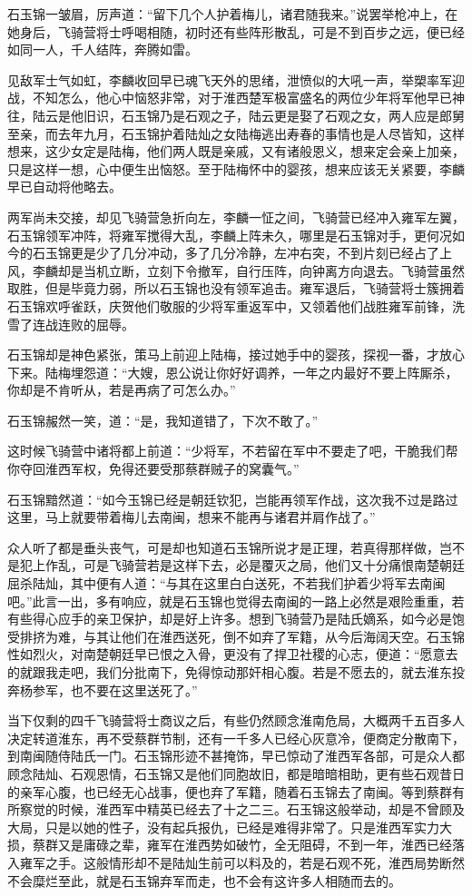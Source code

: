 石玉锦一皱眉，厉声道：“留下几个人护着梅儿，诸君随我来。”说罢举枪冲上，在她身后，飞骑营将士呼喝相随，初时还有些阵形散乱，可是不到百步之远，便已经如同一人，千人结阵，奔腾如雷。

见敌军士气如虹，李麟收回早已魂飞天外的思绪，泄愤似的大吼一声，举槊率军迎战，不知怎么，他心中恼怒非常，对于淮西楚军极富盛名的两位少年将军他早已神往，陆云是他旧识，石玉锦乃是石观之子，陆云更是娶了石观之女，两人应是郎舅至亲，而去年九月，石玉锦护着陆灿之女陆梅逃出寿春的事情也是人尽皆知，这样想来，这少女定是陆梅，他们两人既是亲戚，又有诸般恩义，想来定会亲上加亲，只是这样一想，心中便生出恼怒。至于陆梅怀中的婴孩，想来应该无关紧要，李麟早已自动将他略去。

两军尚未交接，却见飞骑营急折向左，李麟一怔之间，飞骑营已经冲入雍军左翼，石玉锦领军冲阵，将雍军搅得大乱，李麟上阵未久，哪里是石玉锦对手，更何况如今的石玉锦更是少了几分冲动，多了几分冷静，左冲右突，不到片刻已经占了上风，李麟却是当机立断，立刻下令撤军，自行压阵，向钟离方向退去。飞骑营虽然取胜，但是毕竟力弱，所以石玉锦也没有领军追击。雍军退后，飞骑营将士簇拥着石玉锦欢呼雀跃，庆贺他们敬服的少将军重返军中，又领着他们战胜雍军前锋，洗雪了连战连败的屈辱。

石玉锦却是神色紧张，策马上前迎上陆梅，接过她手中的婴孩，探视一番，才放心下来。陆梅埋怨道：“大嫂，恩公说让你好好调养，一年之内最好不要上阵厮杀，你却是不肯听从，若是再病了可怎么办。”

石玉锦赧然一笑，道：“是，我知道错了，下次不敢了。”

这时候飞骑营中诸将都上前道：“少将军，不若留在军中不要走了吧，干脆我们帮你夺回淮西军权，免得还要受那蔡群贼子的窝囊气。”

石玉锦黯然道：“如今玉锦已经是朝廷钦犯，岂能再领军作战，这次我不过是路过这里，马上就要带着梅儿去南闽，想来不能再与诸君并肩作战了。”

众人听了都是垂头丧气，可是却也知道石玉锦所说才是正理，若真得那样做，岂不是犯上作乱，可是飞骑营若是这样下去，必是覆灭之局，他们又十分痛恨南楚朝廷屈杀陆灿，其中便有人道：“与其在这里白白送死，不若我们护着少将军去南闽吧。”此言一出，多有响应，就是石玉锦也觉得去南闽的一路上必然是艰险重重，若有些得心应手的亲卫保护，却是好上许多。想到飞骑营乃是陆氏嫡系，如今必是饱受排挤为难，与其让他们在淮西送死，倒不如弃了军籍，从今后海阔天空。石玉锦性如烈火，对南楚朝廷早已恨之入骨，更没有了捍卫社稷的心志，便道：“愿意去的就跟我走吧，我们分批南下，免得惊动那奸相心腹。若是不愿去的，就去淮东投奔杨参军，也不要在这里送死了。”

当下仅剩的四千飞骑营将士商议之后，有些仍然顾念淮南危局，大概两千五百多人决定转道淮东，再不受蔡群节制，还有一千多人已经心灰意冷，便商定分散南下，到南闽随侍陆氏一门。石玉锦形迹不甚掩饰，早已惊动了淮西军各部，可是众人都顾念陆灿、石观恩情，石玉锦又是他们同胞故旧，都是暗暗相助，更有些石观昔日的亲军心腹，也已经无心战事，便也弃了军籍，随着石玉锦去了南闽。等到蔡群有所察觉的时候，淮西军中精英已经去了十之二三。石玉锦这般举动，却是不曾顾及大局，只是以她的性子，没有起兵报仇，已经是难得非常了。只是淮西军实力大损，蔡群又是庸碌之辈，雍军在淮西势如破竹，全无阻碍，不到一年，淮西已经落入雍军之手。这般情形却不是陆灿生前可以料及的，若是石观不死，淮西局势断然不会糜烂至此，就是石玉锦弃军而走，也不会有这许多人相随而去的。

